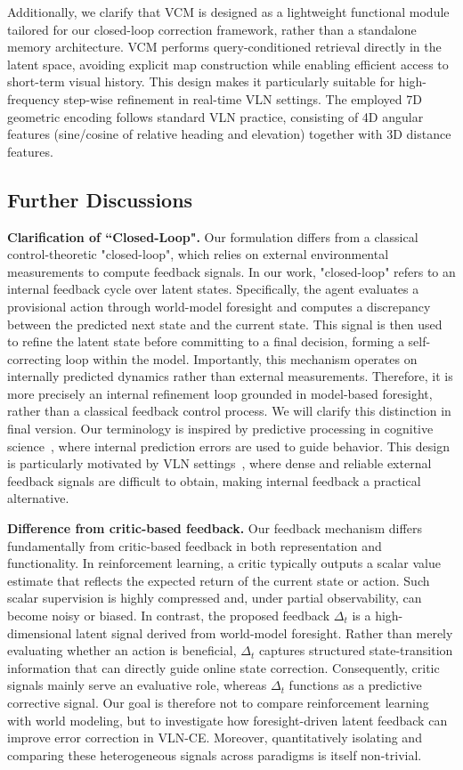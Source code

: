 \documentclass{article}
\theoremstyle{plain}
\theoremstyle{definition}
\theoremstyle{remark}
\begin{document}
Additionally, we clarify that VCM is designed as a lightweight functional module tailored for our closed-loop correction framework, rather than a standalone memory architecture. VCM performs query-conditioned retrieval directly in the latent space, avoiding explicit map construction while enabling efficient access to short-term visual history. This design makes it particularly suitable for high-frequency step-wise refinement in real-time VLN settings. The employed 7D geometric encoding follows standard VLN practice, consisting of 4D angular features (sine/cosine of relative heading and elevation) together with 3D distance features.

\subsection{Further Discussions}
\noindent\textbf{Clarification of ``Closed-Loop".} Our formulation differs from a classical control-theoretic "closed-loop", which relies on external environmental measurements to compute feedback signals. In our work, "closed-loop" refers to an internal feedback cycle over latent states. Specifically, the agent evaluates a provisional action through world-model foresight and computes a discrepancy  between the predicted next state and the current state. This signal is then used to refine the latent state before committing to a final decision, forming a self-correcting loop within the model. Importantly, this mechanism operates on internally predicted dynamics rather than external measurements. Therefore, it is more precisely an internal refinement loop grounded in model-based foresight, rather than a classical feedback control process. We will clarify this distinction in final version. Our terminology is inspired by predictive processing in cognitive science~\cite{huang2011predictive}, where internal prediction errors are used to guide behavior. This design is particularly motivated by VLN settings~\cite{krantz2020beyond}, where dense and reliable external feedback signals are difficult to obtain, making internal feedback a practical alternative. 

\noindent\textbf{Difference from critic-based feedback.}
Our feedback mechanism differs fundamentally from critic-based feedback in both representation and functionality. In reinforcement learning, a critic typically outputs a scalar value estimate that reflects the expected return of the current state or action. Such scalar supervision is highly compressed and, under partial observability, can become noisy or biased. In contrast, the proposed feedback $\Delta_t$ is a high-dimensional latent signal derived from world-model foresight. Rather than merely evaluating whether an action is beneficial, $\Delta_t$ captures structured state-transition information that can directly guide online state correction. Consequently, critic signals mainly serve an evaluative role, whereas $\Delta_t$ functions as a predictive corrective signal. Our goal is therefore not to compare reinforcement learning with world modeling, but to investigate how foresight-driven latent feedback can improve error correction in VLN-CE. Moreover, quantitatively isolating and comparing these heterogeneous signals across paradigms is itself non-trivial.
\end{document}
